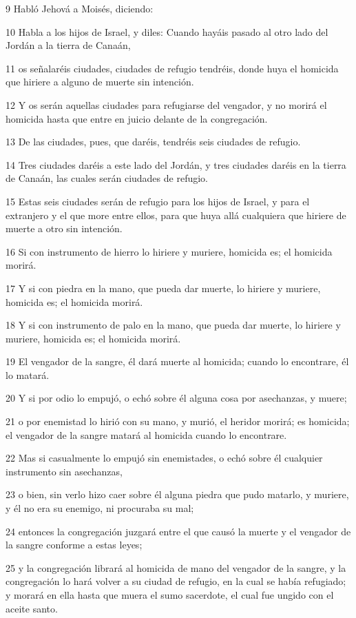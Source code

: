 \par 9 Habló Jehová a Moisés, diciendo:
\par 10 Habla a los hijos de Israel, y diles: Cuando hayáis pasado al otro lado del Jordán a la tierra de Canaán,
\par 11 os señalaréis ciudades, ciudades de refugio tendréis, donde huya el homicida que hiriere a alguno de muerte sin intención.
\par 12 Y os serán aquellas ciudades para refugiarse del vengador, y no morirá el homicida hasta que entre en juicio delante de la congregación.
\par 13 De las ciudades, pues, que daréis, tendréis seis ciudades de refugio.
\par 14 Tres ciudades daréis a este lado del Jordán, y tres ciudades daréis en la tierra de Canaán, las cuales serán ciudades de refugio.
\par 15 Estas seis ciudades serán de refugio para los hijos de Israel, y para el extranjero y el que more entre ellos, para que huya allá cualquiera que hiriere de muerte a otro sin intención.
\par 16 Si con instrumento de hierro lo hiriere y muriere, homicida es; el homicida morirá.
\par 17 Y si con piedra en la mano, que pueda dar muerte, lo hiriere y muriere, homicida es; el homicida morirá.
\par 18 Y si con instrumento de palo en la mano, que pueda dar muerte, lo hiriere y muriere, homicida es; el homicida morirá.
\par 19 El vengador de la sangre, él dará muerte al homicida; cuando lo encontrare, él lo matará.
\par 20 Y si por odio lo empujó, o echó sobre él alguna cosa por asechanzas, y muere;
\par 21 o por enemistad lo hirió con su mano, y murió, el heridor morirá; es homicida; el vengador de la sangre matará al homicida cuando lo encontrare. 
\par 22 Mas si casualmente lo empujó sin enemistades, o echó sobre él cualquier instrumento sin asechanzas,
\par 23 o bien, sin verlo hizo caer sobre él alguna piedra que pudo matarlo, y muriere, y él no era su enemigo, ni procuraba su mal;
\par 24 entonces la congregación juzgará entre el que causó la muerte y el vengador de la sangre conforme a estas leyes;
\par 25 y la congregación librará al homicida de mano del vengador de la sangre, y la congregación lo hará volver a su ciudad de refugio, en la cual se había refugiado; y morará en ella hasta que muera el sumo sacerdote, el cual fue ungido con el aceite santo.
